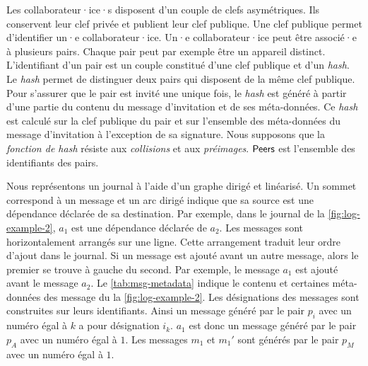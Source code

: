 Les collaborateur·ice·s disposent d'un couple de clefs asymétriques.
Ils conservent leur clef privée et publient leur clef publique.
Une clef publique permet d'identifier un·e collaborateur·ice.
Un·e collaborateur·ice peut être associé·e à plusieurs pairs.
Chaque pair peut par exemple être un appareil distinct.
L'identifiant d'un pair est un couple constitué d'une clef publique et d'un \emph{hash}.
Le \emph{hash} permet de distinguer deux pairs qui disposent de la même clef publique.
Pour s'assurer que le pair est invité une unique fois, le \emph{hash} est généré à partir d'une partie du contenu du message d'invitation et de ses méta-données.
Ce \emph{hash} est calculé sur la clef publique du pair et sur l'ensemble des méta-données du message d'invitation à l'exception de sa signature.
Nous supposons que la \emph{fonction de hash} résiste aux \emph{collisions} et aux \emph{préimages}.
$\operatorname{\mathsf{Peers}}$ est l'ensemble des identifiants des pairs.

Nous représentons un journal à l'aide d'un graphe dirigé et linéarisé.
Un sommet correspond à un message et un arc dirigé indique que sa source est une dépendance déclarée de sa destination.
Par exemple, dans le journal de la \autoref{fig:log-example-2}, $a_1$ est une dépendance déclarée de $a_2$.
Les messages sont horizontalement arrangés sur une ligne.
Cette arrangement traduit leur ordre d'ajout dans le journal.
Si un message est ajouté avant un autre message, alors le premier se trouve à gauche du second.
Par exemple, le message $a_1$ est ajouté avant le message $a_2$.
Le \autoref{tab:msg-metadata} indique le contenu et certaines méta-données des message du  la \autoref{fig:log-example-2}.
Les désignations des messages sont construites sur leurs identifiants.
Ainsi un message généré par le pair $p_i$ avec un numéro égal à $k$ a pour désignation $i_k$.
$a_1$ est donc un message généré par le pair $p_A$ avec un numéro égal à $1$.
Les messages $m_1$ et $m_1'$ sont générés par le pair $p_M$ avec un numéro égal à $1$.


